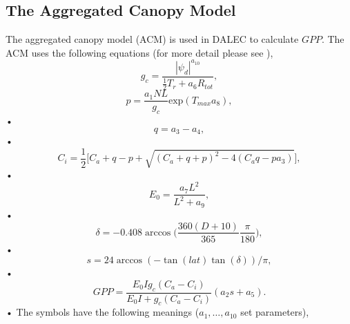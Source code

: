 \documentclass[11pt]{article}
\begin{document}
\subsection*{The Aggregated Canopy Model}
The aggregated canopy model (ACM) is used in DALEC to calculate $GPP$. The ACM uses the following equations (for more detail please see \cite{williams1997predicting}),
\begin{equation} 
g_c = \frac{|\psi_d|^{a_{10}}}{\frac{1}{2}T_r + a_6 R_{tot}},
\end{equation}
\begin{equation}
p = \frac{a_1NL}{g_c}\text{exp}(T_{max}a_8),
\end{equation}•
\begin{equation}
q = a_3 - a_4,
\end{equation}•
\begin{equation}
C_i = \frac{1}{2}\bigg[C_a + q - p + \sqrt{(C_a + q + p)^{2} - 4(C_aq - pa_3)} \bigg],
\end{equation}•
\begin{equation}
E_0 = \frac{a_7L^2}{L^2 + a_9},
\end{equation}•
\begin{equation}
\delta = -0.408\arccos\bigg(\frac{360(D+10)}{365}\frac{\pi}{180}\bigg),
\end{equation}•
\begin{equation}
s = 24\arccos(-\tan(lat)\tan(\delta))/\pi,
\end{equation}•
\begin{equation}
GPP = \frac{E_0Ig_c(C_a-C_i)}{E_0I + g_c(C_a-C_i)}(a_2s + a_5).
\end{equation}•
The symbols have the following meanings ($a_1,\dots ,a_{10}$ set parameters),
\end{document}

